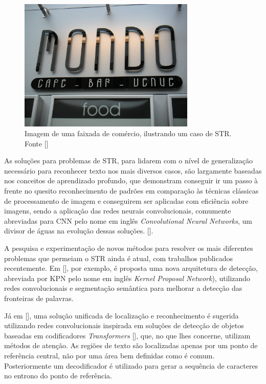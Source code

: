 \begin{figure}
    \centering
    \includegraphics[width=0.75\textwidth]{figs/img_139.jpg}
    \caption{Imagem de uma faixada de comércio, ilustrando um caso de STR. Fonte []}
    \label{fig:str-example}
\end{figure}

As soluções para problemas de STR, para lidarem com o nível de generalização necessário para reconhecer texto nos mais diversos casos, são largamente 
baseadas nos conceitos de aprendizado profundo, que demonstram conseguir ir um passo à frente no quesito reconhecimento de padrões em comparação às 
técnicas clássicas de processamento de imagem e conseguirem ser aplicadas com eficiência sobre imagens, sendo a aplicação das redes neurais convolucionais, 
comumente abreviadas para CNN pelo nome em inglês \textit{Convolutional Neural Networks}, um divisor de águas na evolução dessas soluções. 
[].

A pesquisa e experimentação de novos métodos para resolver os mais diferentes problemas que permeiam o STR ainda é atual, com trabalhos 
publicados recentemente.
Em [], por exemplo, é proposta uma nova arquitetura de detecção, abreviada por KPN pelo nome em inglês \textit{Kernel Proposal Network}), 
utilizando redes convolucionais e segmentação semântica para melhorar a detecção das fronteiras de palavras.

Já em [], uma solução unificada de localização e reconhecimento é sugerida utilizando redes convolucionais inspirada em soluções de 
detecção de objetos baseadas em codificadores \textit{Transformers} [], que, no que lhes concerne, utilizam métodos de atenção. 
As regiões de texto são localizadas apenas por um ponto de referência central, não por uma área bem definidas como é comum. Posteriormente um decodificador 
é utilizado para gerar a sequência de caracteres no entrono do ponto de referência.

